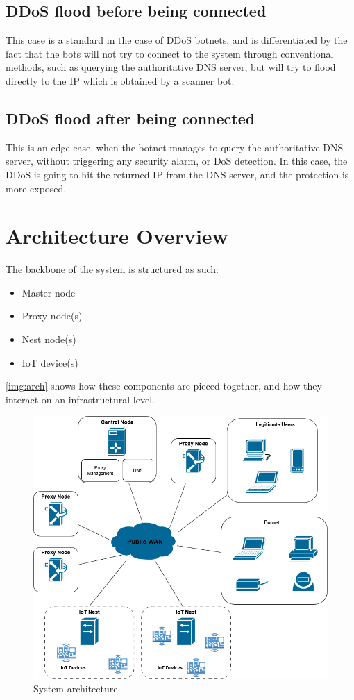 \subsection{DDoS flood before being connected}
This case is a standard in the case of DDoS botnets, and is differentiated by the fact that the bots will not try to connect to the system through conventional methods, such as querying the authoritative DNS server, but will try to flood directly to the IP which is obtained by a scanner bot.

\subsection{DDoS flood after being connected}
This is an edge case, when the botnet manages to query the authoritative DNS server, without triggering any security alarm, or DoS detection. In this case, the DDoS is going to hit the returned IP from the DNS server, and the protection is more exposed.

\section{Architecture Overview}

The backbone of the system is structured as such:
\begin{itemize}
    \setlength\itemsep{1pt}
    \setlength\topsep{1pt}
    \setlength\parsep{1pt}
    \setlength\parskip{1pt}
    \item Master node
    \item Proxy node(s)
    \item Nest node(s)
    \item IoT device(s)
\end{itemize}

\autoref{img:arch}\cite{vladescu2025} shows how these components are pieced together, and how they interact on an infrastructural level.

\begin{figure}[ht]
    \centering
    \includegraphics[width=0.75\linewidth]{images/system_architecture.png}
    \caption{System architecture}
    \label{img:arch}
\end{figure}

